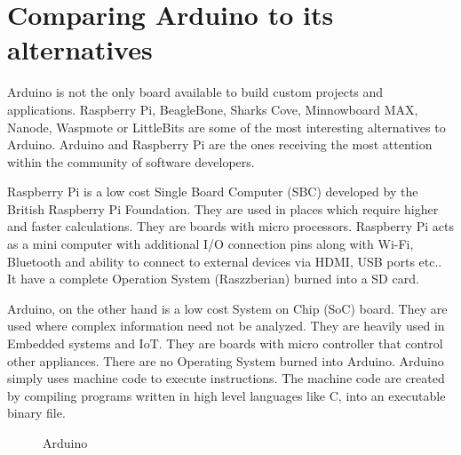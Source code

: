 \section{Comparing Arduino to its alternatives
}
Arduino is not the only board available to build custom projects and applications. Raspberry Pi, BeagleBone, Sharks Cove, Minnowboard MAX, Nanode, Waspmote or LittleBits are some of the most interesting alternatives to Arduino. Arduino and Raspberry Pi are the ones receiving the most attention within the community of software developers.

Raspberry Pi is a low cost Single Board Computer (SBC) developed by the British Raspberry Pi Foundation. They are used in places which require higher and faster calculations. They are boards with micro processors. Raspberry Pi acts as a mini computer with additional I/O connection pins along with Wi-Fi, Bluetooth and ability to connect to external devices via HDMI, USB ports etc.. It have a complete Operation System (Raszzberian) burned into a SD card. 

Arduino, on the other hand is a low cost System on Chip (SoC) board. They are used where complex information need not be analyzed. They are heavily used in Embedded systems and IoT. They are boards with micro controller that control other appliances. There are no Operating System burned into Arduino. Arduino simply uses machine code to execute instructions. The machine code are created by compiling programs written in high level languages like C, into an executable binary file.

\begin{figure}[htp]
  \centering
  \label{figure}
  \caption{Arduino}
\end{figure}

